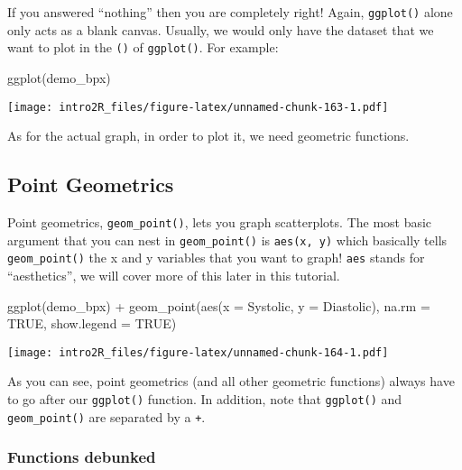 \documentclass[
]{book}
\newenvironment{Shaded}{\begin{snugshade}}{\end{snugshade}}
\newcommand{\AttributeTok}[1]{\textcolor[rgb]{0.77,0.63,0.00}{#1}}
\newcommand{\ConstantTok}[1]{\textcolor[rgb]{0.00,0.00,0.00}{#1}}
\newcommand{\FunctionTok}[1]{\textcolor[rgb]{0.00,0.00,0.00}{#1}}
\newcommand{\NormalTok}[1]{#1}
\newcommand{\SpecialCharTok}[1]{\textcolor[rgb]{0.00,0.00,0.00}{#1}}
\begin{document}
If you answered ``nothing'' then you are completely right! Again, \texttt{ggplot()} alone only acts as a blank canvas. Usually, we would only have the dataset that we want to plot in the \texttt{()} of \texttt{ggplot()}. For example:

\begin{Shaded}
\begin{Highlighting}[]
\FunctionTok{ggplot}\NormalTok{(demo\_bpx)}
\end{Highlighting}
\end{Shaded}

\texttt{[image: intro2R\_files/figure-latex/unnamed-chunk-163-1.pdf]}

As for the actual graph, in order to plot it, we need geometric functions.

\hypertarget{point-geometrics}{%
\subsection{Point Geometrics}\label{point-geometrics}}

Point geometrics, \texttt{geom\_point()}, lets you graph scatterplots. The most basic argument that you can nest in \texttt{geom\_point()} is \texttt{aes(x,\ y)} which basically tells \texttt{geom\_point()} the x and y variables that you want to graph! \texttt{aes} stands for ``aesthetics'', we will cover more of this later in this tutorial.

\begin{Shaded}
\begin{Highlighting}[]
\FunctionTok{ggplot}\NormalTok{(demo\_bpx) }\SpecialCharTok{+}
    \FunctionTok{geom\_point}\NormalTok{(}\FunctionTok{aes}\NormalTok{(}\AttributeTok{x =}\NormalTok{ Systolic, }
                   \AttributeTok{y =}\NormalTok{ Diastolic), }
               \AttributeTok{na.rm =} \ConstantTok{TRUE}\NormalTok{,}
               \AttributeTok{show.legend =} \ConstantTok{TRUE}\NormalTok{) }
\end{Highlighting}
\end{Shaded}

\texttt{[image: intro2R\_files/figure-latex/unnamed-chunk-164-1.pdf]}

As you can see, point geometrics (and all other geometric functions) always have to go after our \texttt{ggplot()} function. In addition, note that \texttt{ggplot()} and \texttt{geom\_point()} are separated by a \texttt{+}.

\hypertarget{functions-debunked-17}{%
\subsubsection{Functions debunked}\label{functions-debunked-17}}
\end{document}
